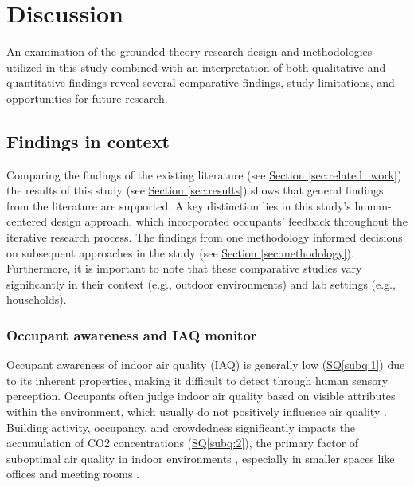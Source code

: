\section{Discussion}
\label{sec:discussion}
An examination of the grounded theory research design and methodologies utilized in this study combined with an interpretation of both qualitative and quantitative findings reveal several comparative findings, study limitations, and opportunities for future research.

\subsection{Findings in context}

Comparing the findings of the existing literature (see \hyperref[sec:related_work]{Section \ref*{sec:related_work}}) the results of this study (see \hyperref[sec:results]{Section \ref*{sec:results}}) shows that general findings from the literature are supported. A key distinction lies in this study's human-centered design approach, which incorporated occupants' feedback throughout the iterative research process. The findings from one methodology informed decisions on subsequent approaches in the study (see \hyperref[sec:methodology]{Section \ref*{sec:methodology}}). Furthermore, it is important to note that these comparative studies vary significantly in their context (e.g., outdoor environments) and lab settings (e.g., households).

\subsubsection{Occupant awareness and IAQ monitor}
Occupant awareness of indoor air quality (IAQ) is generally low (\hyperref[subq:1]{SQ\ref*{subq:1}}) due to its inherent properties, making it difficult to detect through human sensory perception. Occupants often judge indoor air quality based on visible attributes within the environment, which usually do not positively influence air quality \cite{schweizer_indoor_2007} \cite{corlan_importance_2021}. Building activity, occupancy, and crowdedness significantly impacts the accumulation of CO2 concentrations (\hyperref[subq:2]{SQ\ref*{subq:2}}), the primary factor of suboptimal air quality in indoor environments \cite{fromme_indoor_2023} \cite{du_indoor_2020}, especially in smaller spaces like offices and meeting rooms \cite{zhong_complexity_2021}.

